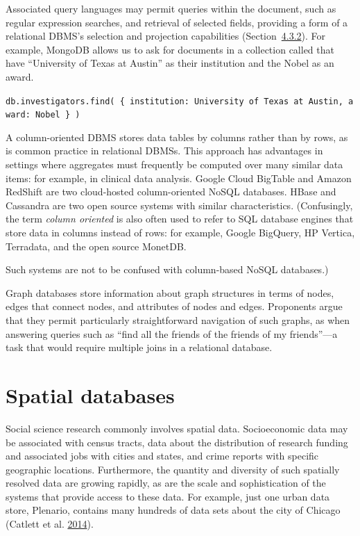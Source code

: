 \documentclass[]{krantz}
\begin{document}
Associated query languages may permit queries within the document, such
as regular expression searches, and retrieval of selected fields,
providing a form of a relational DBMS's selection and projection
capabilities (Section~\protect\hyperlink{sec:db:sql}{4.3.2}). For
example, MongoDB allows us to ask for documents in a collection called
that have ``University of Texas at Austin'' as their institution and the
Nobel as an award.

\texttt{db.investigators.find(\ \{\ institution:\ \textquotesingle{}University\ of\ Texas\ at\ Austin\textquotesingle{},\ award:\ \textquotesingle{}Nobel\textquotesingle{}\ \}\ )}

A column-oriented DBMS stores data tables by columns rather than by
rows, as is common practice in relational DBMSs. This approach has
advantages in settings where aggregates must frequently be computed over
many similar data items: for example, in clinical data analysis. Google
Cloud BigTable and Amazon RedShift are two cloud-hosted column-oriented
NoSQL databases. HBase and Cassandra are two open source systems with
similar characteristics. (Confusingly, the term \emph{column oriented}
is also often used to refer to SQL database engines that store data in
columns instead of rows: for example, Google BigQuery, HP Vertica,
Terradata, and the open source MonetDB.

Such systems are not to be confused with column-based NoSQL databases.)

Graph databases store information about graph structures in terms of
nodes, edges that connect nodes, and attributes of nodes and edges.
Proponents argue that they permit particularly straightforward
navigation of such graphs, as when answering queries such as ``find all
the friends of the friends of my friends''---a task that would require
multiple joins in a relational database.

\enlargethispage{6pt}

\hypertarget{sec:db:spatial}{\section{Spatial
databases}\label{sec:db:spatial}}

Social science research commonly involves spatial data. Socioeconomic
data may be associated with census tracts, data about the distribution
of research funding and associated jobs with cities and states, and
crime reports with specific geographic locations. Furthermore, the
quantity and diversity of such spatially resolved data are growing
rapidly, as are the scale and sophistication of the systems that provide
access to these data. For example, just one urban data store, Plenario,
contains many hundreds of data sets about the city of Chicago (Catlett
et al. \protect\hyperlink{ref-plenario}{2014}).
\end{document}
